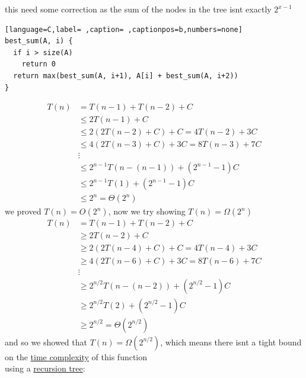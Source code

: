 \documentclass[a4paper,12pt]{article}
\begin{document}
\begin{my_example}
\begin{note}
this need some correction as the sum of the nodes in the tree isnt exactly \(2^{x-1}\)\\[0pt]
\end{note}
\begin{lstlisting}[language=C,label= ,caption= ,captionpos=b,numbers=none]
best_sum(A, i) {
  if i > size(A)
    return 0
  return max(best_sum(A, i+1), A[i] + best_sum(A, i+2))
}
\end{lstlisting}
\begin{align*}
  T(n) &= T(n-1) + T(n-2) + C\\
  &\le 2T(n-1) + C\\
  &\le 2(2T(n-2)+C) + C = 4T(n-2) + 3C\\
  &\le 4(2T(n-3) + C) + 3C = 8T(n-3) + 7C\\
  &\vdots\\
  &\le 2^{n-1}T(n-(n-1)) + \left(2^{n-1}-1\right)C\\
  &\le 2^{n-1}T(1) + \left(2^{n-1}-1\right)C\\
  &\leq 2^n = \Theta(2^n)
\end{align*}
we proved \(T(n) = O(2^n)\), now we try showing \(T(n) = \Omega(2^n)\)\\[0pt]
\begin{align*}
  T(n) &= T(n-1) + T(n-2) + C\\
  &\ge 2T(n-2) + C\\
  &\ge 2(2T(n-4) + C) + C = 4T(n-4) + 3C\\
  &\ge 4(2T(n-6) + C) + 3C = 8T(n-6) + 7C\\
  &\vdots\\
  &\ge 2^{n/2}T(n-(n-2)) + \left(2^{n/2}-1\right)C\\
  &\ge 2^{n/2}T(2) + \left(2^{n/2}-1\right)C\\
  &\ge 2^{n/2} = \Theta\left(2^{n/2}\right)
\end{align*}
and so we showed that \(T(n) = \Omega\left(2^{n/2}\right)\), which means there isnt a tight bound on the \href{20221130014441-time_complexity.org}{time complexity} of this function\\[0pt]
using a \href{20230207143501-recursion_tree.org}{recursion tree}:\\[0pt]
\\[0pt]


\end{my_example}
\end{document}
